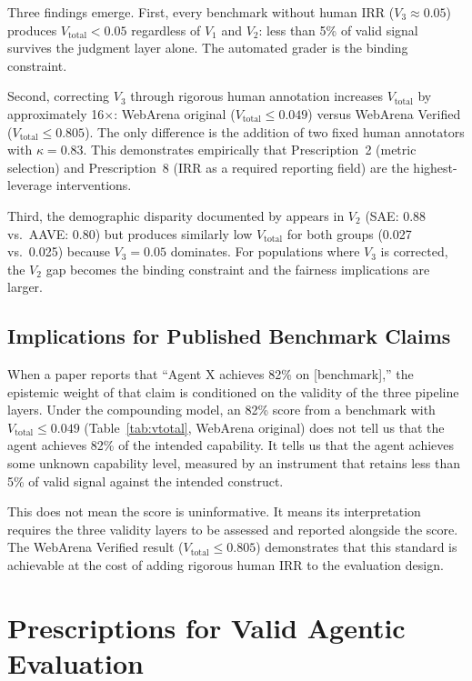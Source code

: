 \documentclass[preprint,12pt]{elsarticle}
\newcommand{\vtot}{V_{\text{total}}}
\begin{document}
Three findings emerge. First, every benchmark without human IRR ($V_3 \approx 0.05$)
produces $\vtot < 0.05$ regardless of $V_1$ and $V_2$: less than 5\% of valid signal
survives the judgment layer alone. The automated grader is the binding constraint.

Second, correcting $V_3$ through rigorous human annotation increases $\vtot$ by
approximately 16$\times$: WebArena original ($\vtot \leq 0.049$) versus WebArena
Verified ($\vtot \leq 0.805$). The only difference is the addition of two fixed
human annotators with $\kappa = 0.83$. This demonstrates empirically that
Prescription~2 (metric selection) and Prescription~8 (IRR as a required reporting
field) are the highest-leverage interventions.

Third, the demographic disparity documented by \citet{seshadri2026} appears in $V_2$
(SAE: 0.88 vs.\ AAVE: 0.80) but produces similarly low $\vtot$ for both groups
(0.027 vs.\ 0.025) because $V_3 = 0.05$ dominates. For populations where $V_3$ is
corrected, the $V_2$ gap becomes the binding constraint and the fairness
implications are larger.

\subsection{Implications for Published Benchmark Claims}
\label{sec:implications}

When a paper reports that ``Agent X achieves 82\% on [benchmark],'' the epistemic
weight of that claim is conditioned on the validity of the three pipeline layers.
Under the compounding model, an 82\% score from a benchmark with $\vtot \leq 0.049$
(Table~\ref{tab:vtotal}, WebArena original) does not tell us that the agent achieves
82\% of the intended capability. It tells us that the agent achieves some unknown
capability level, measured by an instrument that retains less than 5\% of valid
signal against the intended construct.

This does not mean the score is uninformative. It means its interpretation requires
the three validity layers to be assessed and reported alongside the score. The
WebArena Verified result ($\vtot \leq 0.805$) demonstrates that this standard is
achievable at the cost of adding rigorous human IRR to the evaluation design.

\section{Prescriptions for Valid Agentic Evaluation}
\label{sec:prescriptions}
\end{document}
